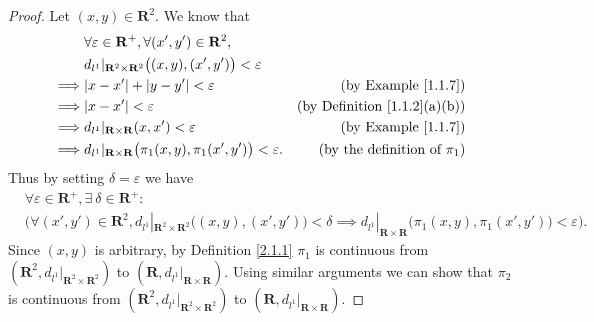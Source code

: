 \begin{proof}
    Let \((x, y) \in \mathbf{R}^2\).
    We know that
    \begin{align*}
                 & \forall \varepsilon \in \mathbf{R}^+, \forall (x', y') \in \mathbf{R}^2,                                                              \\
                 & d_{l^1}|_{\mathbf{R}^2 \times \mathbf{R}^2}\big((x, y), (x', y')\big) < \varepsilon                                                   \\
        \implies & \abs*{x - x'} + \abs*{y - y'} < \varepsilon                                                & \text{(by Example \ref{1.1.7})}          \\
        \implies & \abs*{x - x'} < \varepsilon                                                                & \text{(by Definition \ref{1.1.2}(a)(b))} \\
        \implies & d_{l^1}|_{\mathbf{R} \times \mathbf{R}}(x, x') < \varepsilon                               & \text{(by Example \ref{1.1.7})}          \\
        \implies & d_{l^1}|_{\mathbf{R} \times \mathbf{R}}\big(\pi_1(x, y), \pi_1(x', y')\big) < \varepsilon. & \text{(by the definition of \(\pi_1\))}
    \end{align*}
    Thus by setting \(\delta = \varepsilon\) we have
    \begin{align*}
         & \forall \varepsilon \in \mathbf{R}^+, \exists\ \delta \in \mathbf{R}^+ :                                                                                                                                                        \\
         & \Big(\forall (x', y') \in \mathbf{R}^2, d_{l^1}|_{\mathbf{R}^2 \times \mathbf{R}^2}\big((x, y), (x', y')\big) < \delta \implies d_{l^1}|_{\mathbf{R} \times \mathbf{R}}\big(\pi_1(x, y), \pi_1(x', y')\big) < \varepsilon\Big).
    \end{align*}
    Since \((x, y)\) is arbitrary, by Definition \ref{2.1.1} \(\pi_1\) is continuous from \((\mathbf{R}^2, d_{l^1}|_{\mathbf{R}^2 \times \mathbf{R}^2})\) to \((\mathbf{R}, d_{l^1}|_{\mathbf{R} \times \mathbf{R}})\).
    Using similar arguments we can show that \(\pi_2\) is continuous from \((\mathbf{R}^2, d_{l^1}|_{\mathbf{R}^2 \times \mathbf{R}^2})\) to \((\mathbf{R}, d_{l^1}|_{\mathbf{R} \times \mathbf{R}})\).


\end{proof}
